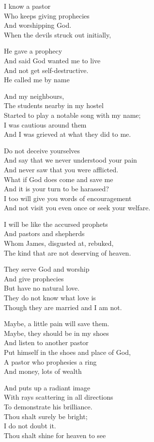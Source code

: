 \documentclass[
]{book}
\begin{document}
I know a pastor\\
Who keeps giving prophecies\\
And worshipping God.\\
When the devils struck out initially,

He gave a prophecy\\
And said God wanted me to live\\
And not get self-destructive.\\
He called me by name

And my neighbours,\\
The students nearby in my hostel\\
Started to play a notable song with my name;\\
I was cautious around them\\
And I was grieved at what they did to me.

Do not deceive yourselves\\
And say that we never understood your pain\\
And never saw that you were afflicted.\\
What if God does come and save me\\
And it is your turn to be harassed?\\
I too will give you words of encouragement\\
And not visit you even once or seek your welfare.

I will be like the accursed prophets\\
And pastors and shepherds\\
Whom James, disgusted at, rebuked,\\
The kind that are not deserving of heaven.

They serve God and worship\\
And give prophecies\\
But have no natural love.\\
They do not know what love is\\
Though they are married and I am not.

Maybe, a little pain will save them.\\
Maybe, they should be in my shoes\\
And listen to another pastor\\
Put himself in the shoes and place of God,\\
A pastor who prophesies a ring\\
And money, lots of wealth

And puts up a radiant image\\
With rays scattering in all directions\\
To demonstrate his brilliance.\\
Thou shalt surely be bright;\\
I do not doubt it.\\
Thou shalt shine for heaven to see
\end{document}
